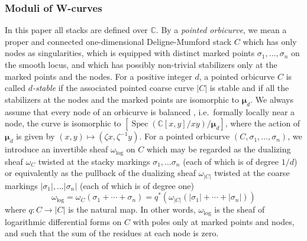 \documentclass[11pt]{amsart}
\theoremstyle{definition} %
\theoremstyle{remark} %
\newcommand{\CC}{\mathbb C}
\newcommand{\Spec}{\operatorname{Spec}}
\newcommand{\bmu}{\boldsymbol{\mu}}
\newcommand{\ov}{\overline}
\begin{document}
\subsubsection{Moduli of W-curves}
In this paper all stacks are defined over $\CC$. 
By a \emph{pointed orbicurve}, we mean a proper 
and connected one-dimensional Deligne-Mumford stack 
$C$ which has only nodes as singularities, which is equipped 
with distinct marked points $\sigma_1,\dots,\sigma_n$ 
on the smooth locus, and which has possibly non-trivial 
stabilizers only at the marked points and the nodes. 
For a positive integer $d$, a pointed orbicurve $C$ 
is called \emph{$d$-stable} \cite{Chistab} 
if the associated pointed coarse curve 
$|C|$ is stable and if all the stabilizers at the nodes and 
the marked points are isomorphic to $\bmu_d$. 
We always assume that every node of an orbicurve 
is balanced \cite{Abramovich-Vistoli}, 
i.e.~formally locally near a node, the curve is 
isomorphic to $[\Spec (\CC[x,y]/xy)/\bmu_d]$, 
where the action of $\bmu_d$ is given by 
$(x,y) \mapsto (\zeta x, \zeta^{-1} y)$. 
For a pointed orbicurve $(C,\sigma_1,\dots,\sigma_n)$, 
we introduce an invertible sheaf $\omega_{\log}$ on $C$ 
which may be regarded as the dualizing sheaf
$\omega_C$ twisted at the stacky markings $\sigma_1, \dots \sigma_n$ 
(each of which is of degree $1/d$) 
or equivalently as the pullback of the dualizing sheaf 
$\omega_{|C|}$ twisted at the coarse markings 
$|\sigma_1|, \dots |\sigma_n|$ (each of which is of 
degree one) 
 \[
\omega_{\log} = \omega_{C}(\sigma_1 + \cdots + \sigma_n)=
q^* \left(\omega_{|C|}(|\sigma_1| + \cdots + |\sigma_n|) \right)
\]
where $q\colon C \to |C|$ is the natural map. 
In other words, $\omega_{\log}$ is the sheaf of 
logarithmic differential forms on $C$ with poles 
only at marked points and 
nodes, and such that 
the sum of the residues at each node is zero. 
\end{document}
